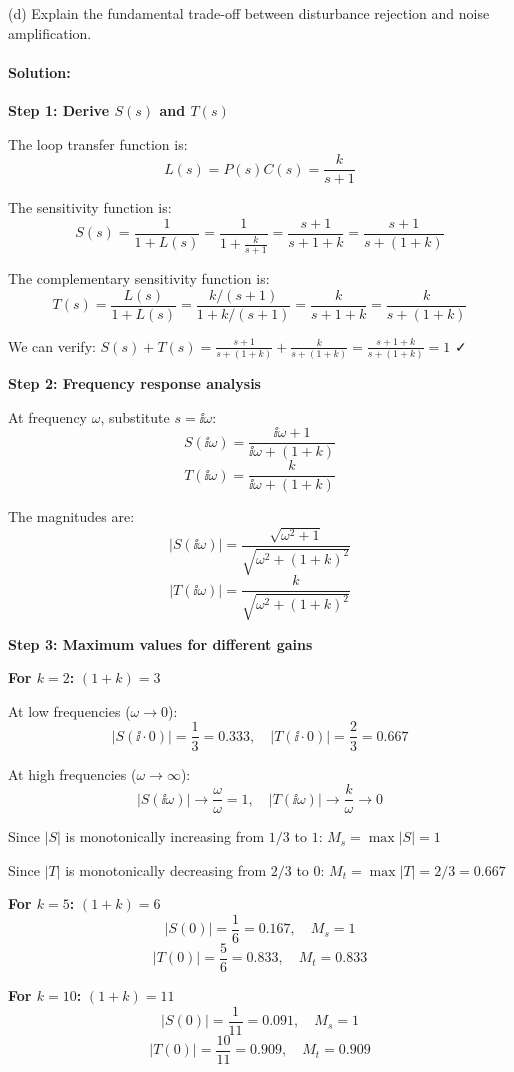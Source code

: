 \documentclass[11pt,a4paper]{article}
\begin{document}
(d) Explain the fundamental trade-off between disturbance rejection and noise amplification.

\paragraph{Solution:}

\textbf{Step 1: Derive $S(s)$ and $T(s)$}

The loop transfer function is:
\[
L(s) = P(s)C(s) = \frac{k}{s+1}
\]

The sensitivity function is:
\[
S(s) = \frac{1}{1 + L(s)} = \frac{1}{1 + \frac{k}{s+1}} = \frac{s+1}{s+1+k} = \frac{s+1}{s+(1+k)}
\]

The complementary sensitivity function is:
\[
T(s) = \frac{L(s)}{1 + L(s)} = \frac{k/(s+1)}{1 + k/(s+1)} = \frac{k}{s+1+k} = \frac{k}{s+(1+k)}
\]

We can verify: $S(s) + T(s) = \frac{s+1}{s+(1+k)} + \frac{k}{s+(1+k)} = \frac{s+1+k}{s+(1+k)} = 1$ ✓

\textbf{Step 2: Frequency response analysis}

At frequency $\omega$, substitute $s = \ii\omega$:
\[
S(\ii\omega) = \frac{\ii\omega + 1}{\ii\omega + (1+k)}
\]
\[
T(\ii\omega) = \frac{k}{\ii\omega + (1+k)}
\]

The magnitudes are:
\[
|S(\ii\omega)| = \frac{\sqrt{\omega^2 + 1}}{\sqrt{\omega^2 + (1+k)^2}}
\]
\[
|T(\ii\omega)| = \frac{k}{\sqrt{\omega^2 + (1+k)^2}}
\]

\textbf{Step 3: Maximum values for different gains}

\textbf{For $k = 2$:} $(1+k) = 3$

At low frequencies ($\omega \to 0$):
\[
|S(\ii \cdot 0)| = \frac{1}{3} = 0.333, \quad |T(\ii \cdot 0)| = \frac{2}{3} = 0.667
\]

At high frequencies ($\omega \to \infty$):
\[
|S(\ii\omega)| \to \frac{\omega}{\omega} = 1, \quad |T(\ii\omega)| \to \frac{k}{\omega} \to 0
\]

Since $|S|$ is monotonically increasing from $1/3$ to $1$: $M_s = \max |S| = 1$

Since $|T|$ is monotonically decreasing from $2/3$ to $0$: $M_t = \max |T| = 2/3 = 0.667$

\textbf{For $k = 5$:} $(1+k) = 6$
\[
|S(0)| = \frac{1}{6} = 0.167, \quad M_s = 1
\]
\[
|T(0)| = \frac{5}{6} = 0.833, \quad M_t = 0.833
\]

\textbf{For $k = 10$:} $(1+k) = 11$
\[
|S(0)| = \frac{1}{11} = 0.091, \quad M_s = 1
\]
\[
|T(0)| = \frac{10}{11} = 0.909, \quad M_t = 0.909
\]
\end{document}
